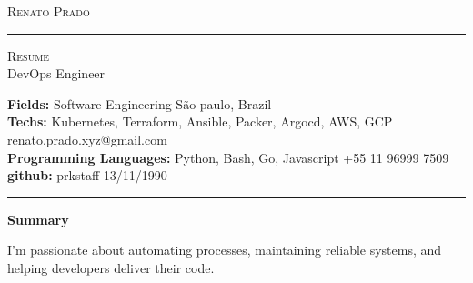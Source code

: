 \documentclass[10pt,A4]{article}
\newcommand{\cvsection}[1]
{
	\begin{center}
		\large\textcolor{sectcol}{\textbf{#1}}
	\end{center}
}
\newcommand{\metasection}[2]
{
\footnotesize{#2} \hspace*{\fill} \footnotesize{#1}\\[1pt]
}
\begin{document}
\pagestyle{fancy}	








\vspace{-8pt}
\begin{center}
	\HUGE \textsc{Renato Prado} \textcolor{sectcol}{\rule[-1mm]{1mm}{0.9cm}} \textsc{Resume}\\[2pt]
	\small DevOps Engineer
\end{center}



\vspace{6pt}


\metasection{São paulo, Brazil}{\textbf{Fields:} Software Engineering} 
\metasection{renato.prado.xyz@gmail.com}{\textbf{Techs:} Kubernetes, Terraform, Ansible, Packer, Argocd, AWS, GCP}
\metasection{+55 11 96999 7509}{\textbf{Programming Languages:} Python, Bash, Go, Javascript}
\metasection{13/11/1990}{\textbf{github:} prkstaff}
\vspace{-2pt}
\textcolor{softcol}{\hrule}
\vspace{6pt}

\normalsize

\vspace{-6pt}
\cvsection{Summary}
I'm passionate about automating processes, maintaining reliable systems, and helping developers deliver their code.\\
\end{document}
